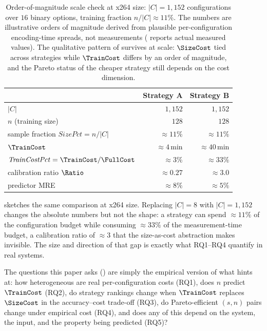 \begin{table}[t]
\centering
\caption{Order-of-magnitude scale check at x264 size: $|C|=1{,}152$
configurations over $16$ binary options, training fraction $n/|C|\approx
11\%$. The numbers are illustrative orders of magnitude derived from
plausible per-configuration encoding-time spreads, not measurements
( reports actual measured values). The qualitative
pattern of  survives at scale: $\SizeCost$
tied across strategies while $\TrainCost$ differs by an order of
magnitude, and the Pareto status of the cheaper strategy still depends
on the cost dimension.}
\label{tab:running-example-scale}
\footnotesize
\setlength{\tabcolsep}{6pt}
\begin{tabular}{l r r}
\toprule
                                          & Strategy A    & Strategy B    \\
\midrule
$|C|$                                     & $1{,}152$     & $1{,}152$     \\
$n$ (training size)                       & $128$         & $128$         \\
sample fraction $\mathit{SizePct}=n/|C|$  & $\approx\!\!11\%$ & $\approx\!\!11\%$ \\
\midrule
$\TrainCost$                              & $\approx\!\!4$\,min  & $\approx\!\!40$\,min \\
$\mathit{TrainCostPct}=\TrainCost/\FullCost$ & $\approx\!\!3\%$  & $\approx\!\!33\%$ \\
calibration ratio $\Ratio$                & $\approx\!\!0.27$    & $\approx\!\!3.0$  \\
\midrule
predictor MRE                             & $\approx\!\!8\%$     & $\approx\!\!5\%$  \\
\bottomrule
\end{tabular}
\end{table}

 sketches the same comparison at x264
size. Replacing $|C|=8$ with $|C|=1{,}152$ changes the absolute numbers
but not the shape: a strategy can spend $\approx\!\!11\%$ of the
configuration budget while consuming $\approx\!\!33\%$ of the
measurement-time budget, a calibration ratio of $\approx\!\!3$ that the
size-as-cost abstraction makes invisible. The size and direction of that
gap is exactly what RQ1--RQ4 quantify in real systems.

The questions this paper asks () are simply the
empirical version of what  hints at: how
heterogeneous are real per-configuration costs (RQ1), does $n$ predict
$\TrainCost$ (RQ2), do strategy rankings change when $\TrainCost$
replaces $\SizeCost$ in the accuracy--cost trade-off (RQ3), do
Pareto-efficient $(s,n)$ pairs change under empirical cost (RQ4), and
does any of this depend on the system, the input, and the property being
predicted (RQ5)?

